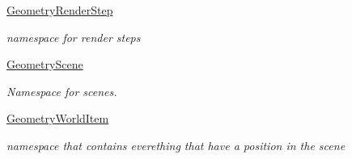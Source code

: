 \begin{DoxyCompactItemize}
 \mbox{\hyperlink{namespace_geometry_engine_1_1_geometry_render_step}{Geometry\+Render\+Step}}
\begin{DoxyCompactList}\small\item\em namespace for render steps \end{DoxyCompactList}\item 
 \mbox{\hyperlink{namespace_geometry_engine_1_1_geometry_scene}{Geometry\+Scene}}
\begin{DoxyCompactList}\small\item\em Namespace for scenes. \end{DoxyCompactList}\item 
 \mbox{\hyperlink{namespace_geometry_engine_1_1_geometry_world_item}{Geometry\+World\+Item}}
\begin{DoxyCompactList}\small\item\em namespace that contains everething that have a position in the scene \end{DoxyCompactList}\end{DoxyCompactItemize}
